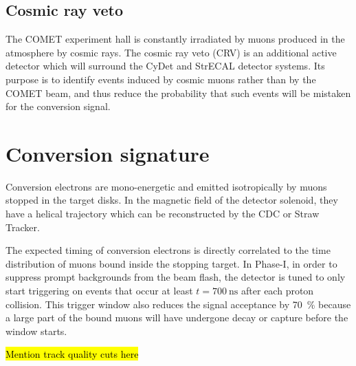 




\subsection{Cosmic ray veto}
The COMET experiment hall is constantly irradiated by muons produced in the
atmosphere by cosmic rays. The cosmic ray veto (CRV) is an additional active
detector which will surround the CyDet and StrECAL detector systems. Its purpose
is to identify events induced by cosmic muons rather than by the COMET beam, and
thus reduce the probability that such events will be mistaken for the conversion
signal.


\section{Conversion signature}
Conversion electrons are mono-energetic and emitted isotropically by muons
stopped in the target disks. In the magnetic field of the detector solenoid,
they have a helical trajectory which can be reconstructed by the CDC or Straw
Tracker.

The expected timing of conversion electrons is directly correlated to the time
distribution of muons bound inside the stopping target. In Phase-I, in order to
suppress prompt backgrounds from the beam flash, the detector is tuned to only
start triggering on events that occur at least $t=\SI{700}{\ns}$ after each
proton collision. This trigger window also reduces the signal acceptance by
\SI{70}{\percent} because a large part of the bound muons will have undergone
decay or capture before the window starts.

\hl{ Mention track quality cuts here}




